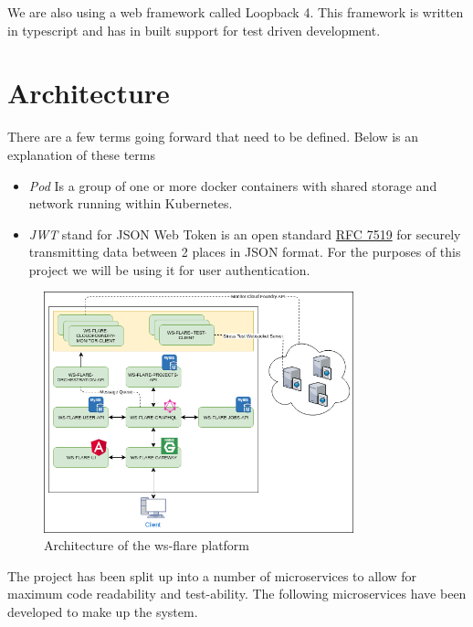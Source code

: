 We are also using a web framework called Loopback 4. This framework is written in typescript and has in built support for test driven development.

\section{Architecture}

There are a few terms going forward that need to be defined. Below is an explanation of these terms

\begin{itemize}
  \item \emph{Pod} Is a group of one or more docker containers with shared storage and network running within Kubernetes.
  \item \emph{JWT} stand for JSON Web Token is an open standard \href{https://tools.ietf.org/html/rfc7519}{RFC 7519} for securely transmitting data between 2 places in JSON format. For the purposes of this project we will be using it for user authentication.
\end{itemize}

\begin{figure}[!h]
  \centering
    \includegraphics[width=0.8\textwidth]{figures/architecture.png}
    \caption{Architecture of the ws-flare platform}
    \label{fig:https-handshake}
\end{figure}

The project has been split up into a number of microservices to allow for maximum code readability and test-ability. The following microservices have been developed to make up the system.

